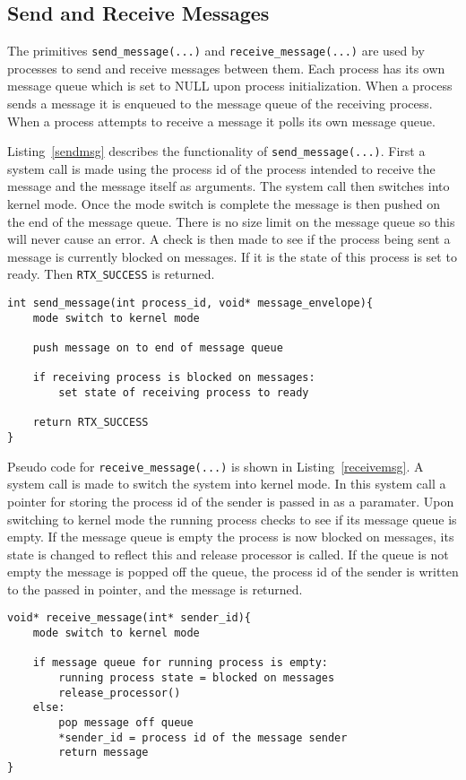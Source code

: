 \documentclass[oneside]{article}
\begin{document}
\subsection*{Send and Receive Messages}

The primitives \texttt{send\_message(...)} and \texttt{receive\_message(...)}
are used by processes to send and receive messages between them. Each process
has its own message queue which is set to NULL upon process initialization.
When a process sends a message it is enqueued to the message queue of the
receiving process. When a process attempts to receive a message it polls its
own message queue.

Listing~\ref{sendmsg} describes the functionality of
\texttt{send\_message(...)}.  First a system call is made using the process id
of the process intended to receive the message and the message itself as
arguments. The system call then switches into kernel mode. Once the mode
switch is complete the message is then pushed on the end of the message queue.
There is no size limit on the message queue so this will never cause an
error. A check is then made to see if the process being sent a message is
currently blocked on messages. If it is the state of this process is set to
ready. Then \texttt{RTX\_SUCCESS} is returned.


\begin{lstlisting}
int send_message(int process_id, void* message_envelope){
    mode switch to kernel mode

    push message on to end of message queue

    if receiving process is blocked on messages:
        set state of receiving process to ready

    return RTX_SUCCESS
}
\end{lstlisting}


Pseudo code for \texttt{receive\_message(...)} is shown in
Listing~\ref{receivemsg}. A system call is made to switch the system into
kernel mode. In this system call a pointer for storing the process id of the
sender is passed in as a paramater. Upon switching to kernel mode the running
process checks to see if its message queue is empty. If the message queue is
empty the process is now blocked on messages, its state is changed to reflect
this and release processor is called. If the queue is not empty the message is
popped off the queue, the process id of the sender is written to the passed in
pointer, and the message is returned. 


\begin{lstlisting}
void* receive_message(int* sender_id){
    mode switch to kernel mode

    if message queue for running process is empty:
        running process state = blocked on messages
        release_processor()
    else:
        pop message off queue
        *sender_id = process id of the message sender
        return message      
}
\end{lstlisting}
\end{document}
